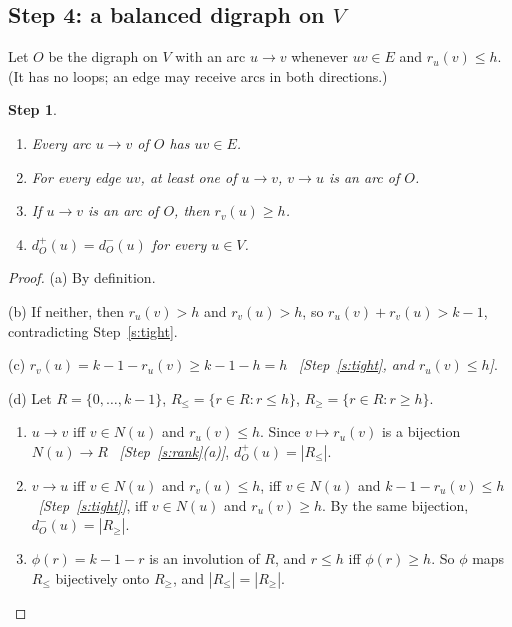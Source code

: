 \documentclass[11pt]{article}
\theoremstyle{plain}
\newtheorem{claim}{Step}
\theoremstyle{definition}
\newcommand{\dout}{d^{+}}
\newcommand{\din}{d^{-}}
\newcommand{\half}{h}
\newcommand{\why}[1]{\unskip\ \textit{[#1]}}
\newenvironment{steps}{\begin{enumerate}[label=(\arabic*),leftmargin=2.2em,itemsep=0.35em]}{\end{enumerate}}
\begin{document}
\subsection*{Step 4: a balanced digraph on $V$}

Let $O$ be the digraph on $V$ with an arc $u\to v$ whenever $uv\in E$ and $r_u(v)\le\half$.
(It has no loops; an edge may receive arcs in both directions.)

\begin{claim}\label{s:O}
\begin{enumerate}[label=(\alph*)]
  \item Every arc $u\to v$ of $O$ has $uv\in E$.
  \item For every edge $uv$, at least one of $u\to v$, $v\to u$ is an arc of $O$.
  \item If $u\to v$ is an arc of $O$, then $r_v(u)\ge\half$.
  \item $\dout_O(u)=\din_O(u)$ for every $u\in V$.
\end{enumerate}
\end{claim}

\begin{proof}
(a) By definition.

(b) If neither, then $r_u(v)>\half$ and $r_v(u)>\half$, so $r_u(v)+r_v(u)>k-1$, contradicting
Step~\ref{s:tight}.

(c) $r_v(u)=k-1-r_u(v)\ge k-1-\half=\half$ \why{Step~\ref{s:tight}, and $r_u(v)\le\half$}.

(d) Let $R=\{0,\dots,k-1\}$, $R_{\le}=\{r\in R:r\le\half\}$, $R_{\ge}=\{r\in R:r\ge\half\}$.
\begin{steps}
  \item $u\to v$ iff $v\in N(u)$ and $r_u(v)\le\half$. Since $v\mapsto r_u(v)$ is a bijection
    $N(u)\to R$ \why{Step~\ref{s:rank}(a)}, $\dout_O(u)=|R_{\le}|$.
  \item $v\to u$ iff $v\in N(u)$ and $r_v(u)\le\half$, iff $v\in N(u)$ and
    $k-1-r_u(v)\le\half$ \why{Step~\ref{s:tight}}, iff $v\in N(u)$ and $r_u(v)\ge\half$. By the
    same bijection, $\din_O(u)=|R_{\ge}|$.
  \item $\phi(r)=k-1-r$ is an involution of $R$, and $r\le\half$ iff $\phi(r)\ge\half$. So $\phi$
    maps $R_{\le}$ bijectively onto $R_{\ge}$, and $|R_{\le}|=|R_{\ge}|$. \qedhere
\end{steps}
\end{proof}

\end{document}

